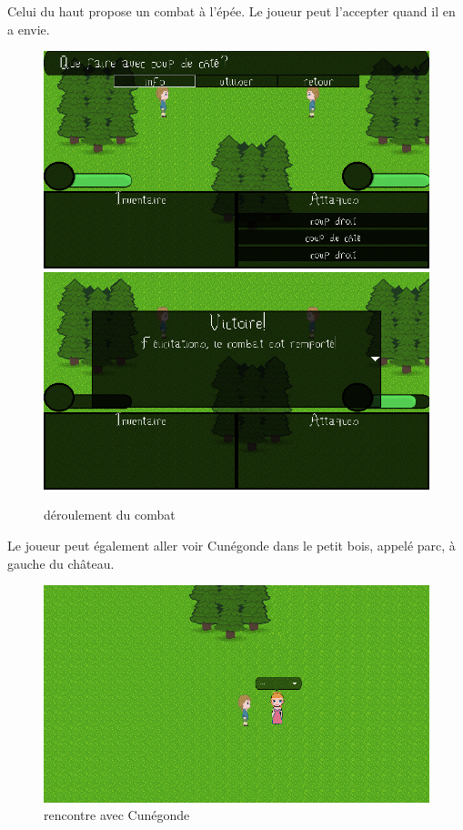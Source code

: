 \documentclass[11pt]{article}
\begin{document}
Celui du haut propose un combat à l'épée. Le joueur peut l'accepter quand il en a envie. 

\begin{figure}[H]
\includegraphics[scale=0.35]{gameplay6}
\includegraphics[scale=0.35]{gameplay7}
\centering
\caption{déroulement du combat}
\label{gagne}
\end{figure}

Le joueur peut également aller voir Cunégonde dans le petit bois, appelé parc, à gauche du château.

\begin{figure}[H]
\includegraphics[scale=0.35]{gameplay8}
\centering
\caption{rencontre avec Cunégonde}
\end{figure}
\end{document}
